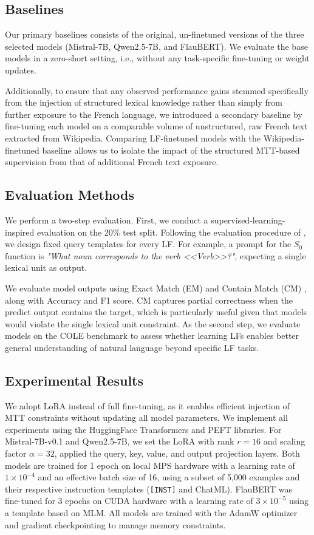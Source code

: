 \documentclass[11pt]{article}
\begin{document}
\subsection{Baselines}
Our primary baselines consists of the original, un-finetuned versions of the three selected models (Mistral-7B, Qwen2.5-7B, and FlauBERT). We evaluate the base models in a zero-short setting, i.e., without any task-specific fine-tuning or weight updates. 

Additionally, to ensure that any observed performance gains stemmed specifically from the injection of structured lexical knowledge rather than simply from further exposure to the French language, we introduced a secondary baseline by fine-tuning each model on a comparable volume of unstructured, raw French text extracted from Wikipedia. Comparing LF-finetuned models with the Wikipedia-finetuned baseline allows us to  isolate the impact of the structured MTT-based supervision from that of additional French text exposure.

\subsection{Evaluation Methods}
We perform a two-step evaluation. First, we conduct a supervised-learning-inspired evaluation on the 20\% test split. Following the evaluation procedure of \citet{petrovQALFFrenchQuestionAnswering2025}, we design fixed query templates for every LF. For example, a prompt for the $S_0$ function is \textit{"What noun corresponds to the verb <<Verb>>?"}, expecting a single lexical unit as output. 

We evaluate model outputs using Exact Match (EM) and Contain Match (CM) \citep{petrovQALFFrenchQuestionAnswering2025}, along with Accuracy and F1 score. CM captures partial correctness when the predict output contains the target, which is particularly useful given that models would violate the single lexical unit constraint. As the second step, we evaluate models on the COLE benchmark \citep{beaucheminCOLEComprehensiveBenchmark2025} to assess whether learning LFs enables better general understanding of natural language beyond specific LF tasks.

\subsection{Experimental Results}
We adopt LoRA instead of full fine-tuning, as it enables efficient injection of MTT constraints without updating all model parameters. We implement all experiments using the HuggingFace Transformers and PEFT libraries. For Mistral-7B-v0.1 and Qwen2.5-7B, we set the LoRA with rank $r=16$ and scaling factor $\alpha=32$, applied the query, key, value, and output projection layers. Both models are trained for 1 epoch on local MPS hardware with a learning rate of $1 \times 10^{-4}$ and an effective batch size of 16, using a subset of 5,000 examples and their respective instruction templates (\texttt{[INST]} and ChatML). FlauBERT was fine-tuned for 3 epochs on CUDA hardware with a learning rate of $3 \times 10^{-5}$ using a template based on MLM. All models are trained with the AdamW optimizer and gradient checkpointing to manage memory constraints.
\end{document}
